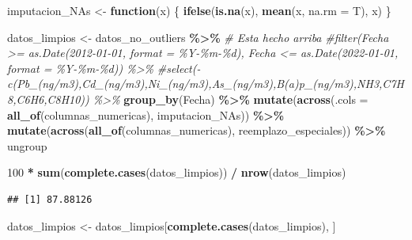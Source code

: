 \documentclass[notspecified,article,submit,moreauthors,pdftex]{Definitions/mdpi}
\newenvironment{Shaded}{\begin{snugshade}}{\end{snugshade}}
\newcommand{\AttributeTok}[1]{\textcolor[rgb]{0.13,0.29,0.53}{#1}}
\newcommand{\CommentTok}[1]{\textcolor[rgb]{0.56,0.35,0.01}{\textit{#1}}}
\newcommand{\ControlFlowTok}[1]{\textcolor[rgb]{0.13,0.29,0.53}{\textbf{#1}}}
\newcommand{\DecValTok}[1]{\textcolor[rgb]{0.00,0.00,0.81}{#1}}
\newcommand{\FunctionTok}[1]{\textcolor[rgb]{0.13,0.29,0.53}{\textbf{#1}}}
\newcommand{\NormalTok}[1]{#1}
\newcommand{\OtherTok}[1]{\textcolor[rgb]{0.56,0.35,0.01}{#1}}
\newcommand{\SpecialCharTok}[1]{\textcolor[rgb]{0.81,0.36,0.00}{\textbf{#1}}}
\begin{document}
\begin{Shaded}
\begin{Highlighting}[]
\NormalTok{imputacion\_NAs }\OtherTok{\textless{}{-}} \ControlFlowTok{function}\NormalTok{(x) \{}
  \FunctionTok{ifelse}\NormalTok{(}\FunctionTok{is.na}\NormalTok{(x), }\FunctionTok{mean}\NormalTok{(x, }\AttributeTok{na.rm =}\NormalTok{ T), x)}
\NormalTok{\}}

\NormalTok{datos\_limpios }\OtherTok{\textless{}{-}}\NormalTok{ datos\_no\_outliers }\SpecialCharTok{\%\textgreater{}\%}
  \CommentTok{\# Esta hecho arriba}
  \CommentTok{\#filter(Fecha \textgreater{}= as.Date(\textquotesingle{}2012{-}01{-}01\textquotesingle{}, format = \textquotesingle{}\%Y{-}\%m{-}\%d\textquotesingle{}), Fecha \textless{}= as.Date(\textquotesingle{}2022{-}01{-}01\textquotesingle{}, format = \textquotesingle{}\%Y{-}\%m{-}\%d\textquotesingle{})) \%\textgreater{}\%}
  \CommentTok{\#select({-}c(\textquotesingle{}Pb\_(ng/m3)\textquotesingle{},\textquotesingle{}Cd\_(ng/m3)\textquotesingle{},\textquotesingle{}Ni\_(ng/m3)\textquotesingle{},\textquotesingle{}As\_(ng/m3)\textquotesingle{},\textquotesingle{}B(a)p\_(ng/m3)\textquotesingle{},\textquotesingle{}NH3\textquotesingle{},\textquotesingle{}C7H8\textquotesingle{},\textquotesingle{}C6H6\textquotesingle{},\textquotesingle{}C8H10\textquotesingle{})) \%\textgreater{}\%}
  \FunctionTok{group\_by}\NormalTok{(Fecha) }\SpecialCharTok{\%\textgreater{}\%}
  \FunctionTok{mutate}\NormalTok{(}\FunctionTok{across}\NormalTok{(}\AttributeTok{.cols =} \FunctionTok{all\_of}\NormalTok{(columnas\_numericas), imputacion\_NAs)) }\SpecialCharTok{\%\textgreater{}\%}
  \FunctionTok{mutate}\NormalTok{(}\FunctionTok{across}\NormalTok{(}\FunctionTok{all\_of}\NormalTok{(columnas\_numericas), reemplazo\_especiales)) }\SpecialCharTok{\%\textgreater{}\%}
\NormalTok{  ungroup}

\DecValTok{100} \SpecialCharTok{*} \FunctionTok{sum}\NormalTok{(}\FunctionTok{complete.cases}\NormalTok{(datos\_limpios)) }\SpecialCharTok{/} \FunctionTok{nrow}\NormalTok{(datos\_limpios)}
\end{Highlighting}
\end{Shaded}

\begin{verbatim}
## [1] 87.88126
\end{verbatim}

\begin{Shaded}
\begin{Highlighting}[]
\NormalTok{datos\_limpios }\OtherTok{\textless{}{-}}\NormalTok{ datos\_limpios[}\FunctionTok{complete.cases}\NormalTok{(datos\_limpios), ]}
\end{Highlighting}
\end{Shaded}
\end{document}
